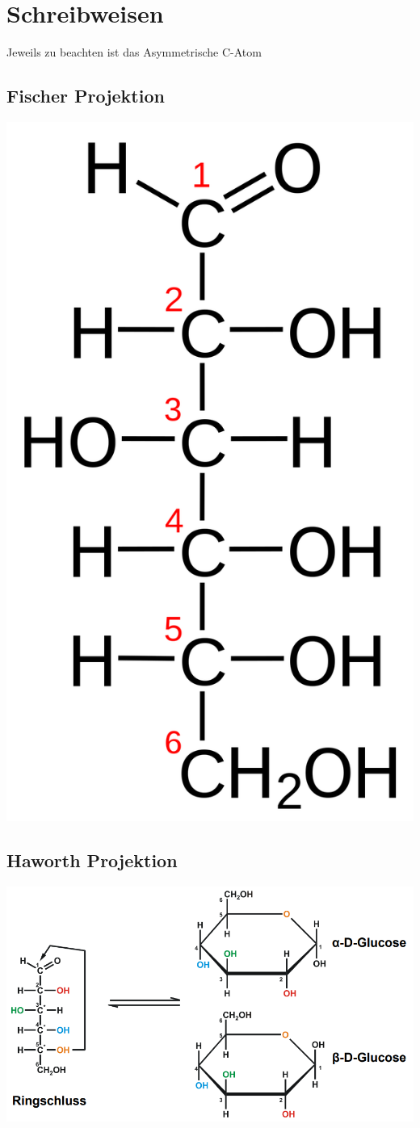 \section{Schreibweisen}
Jeweils zu beachten ist das Asymmetrische C-Atom
\subsection{Fischer Projektion}
\includegraphics[scale=0.06]{media/naturstoffe/fischer.png}
\subsection{Haworth Projektion}
\includegraphics[scale=0.86]{media/naturstoffe/haworth.png}
